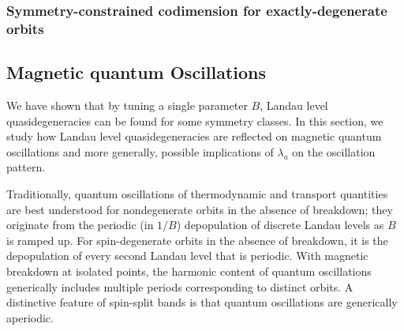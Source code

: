 \documentclass[aps, prb, showpacs, twocolumn, notitlepage, superscriptaddress]{revtex4-1}
\begin{document}

\subsubsection{Symmetry-constrained codimension for exactly-degenerate orbits}



\subsection{Magnetic quantum Oscillations}\label{sec:qo}

We have shown that by tuning a single parameter $B$, Landau level quasidegeneracies can be found for some symmetry classes. In this section, we study how Landau level quasidegeneracies are reflected on magnetic quantum oscillations and more generally, possible implications of $\lambda_a$ on the oscillation pattern.

Traditionally, quantum oscillations of thermodynamic and transport quantities are best understood for nondegenerate orbits in the absence of breakdown; they originate from the periodic (in $1/B$) depopulation of discrete Landau levels as $B$ is ramped up. For spin-degenerate orbits in the absence of breakdown, it is the depopulation of every second Landau level that is periodic. With magnetic breakdown at isolated points, the harmonic content of quantum oscillations generically includes multiple periods corresponding to distinct orbits. A distinctive feature of spin-split bands is that quantum oscillations are generically aperiodic. 

\end{document}
